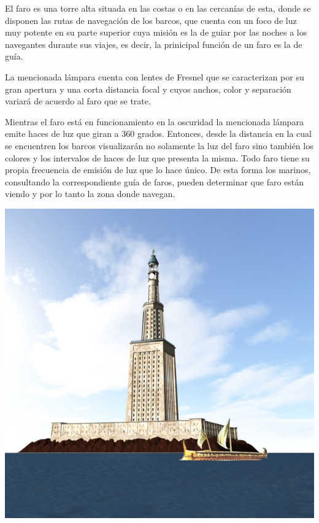 \begin{minipage}[c]{0.6\textwidth}
El faro es una torre alta situada en las costas o en las cercanías de esta, donde se disponen las rutas de navegación de los barcos, que cuenta con un foco de luz muy potente en su parte superior cuya misión es la de guiar por las noches a los navegantes durante sus viajes, es decir, la prinicipal función de un faro es la de guía.

La mencionada lámpara cuenta con lentes de Fresnel que se caracterizan por su gran apertura y una corta distancia focal y cuyos anchos, color y separación variará de acuerdo al faro que se trate.

Mientras el faro está en funcionamiento en la oscuridad la mencionada lámpara emite haces de luz que giran a 360 grados. Entonces, desde la distancia en la cual se encuentren los barcos visualizarán no solamente la luz del faro sino también los colores y los intervalos de haces de luz que presenta la misma. Todo faro tiene su propia frecuencia de emisión de luz que lo hace único. De esta forma los marinos, consultando la correspondiente guía de faros, pueden determinar que faro están viendo y por lo tanto la zona donde navegan.
\end{minipage}
\begin{minipage}[c]{0.4\textwidth}

  \centering
  \includegraphics[width=0.9\linewidth]{06.radionavegacion/Imagenes/06.02.vor.imagenes/faro-alejandria.jpg}
  \label{fig:faro.alejandria}

\end{minipage}

